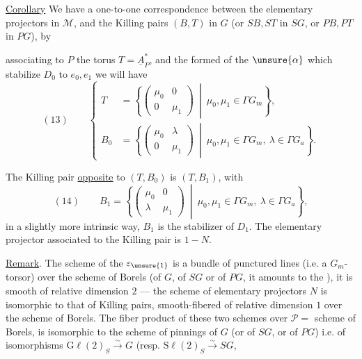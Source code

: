 \uline{Corollary} We have a one-to-one correspondence between the elementary projectors in $\mathcal M$, and the Killing pairs $(B,T)$ in $G$ (or $SB,ST$ in $SG$, or $PB,PT$ in $PG$), by



associating to  $P$ the  torus
$T=\underline{A}_P^*$, and the
formed of the $\unsure{\alpha}$ which stabilize
 $D_0$
to $e_0,e_1$ we will have
\[
(13)\qquad
\left\{
\begin{aligned}
T&=\left\{\begin{pmatrix}\mu_0&0\\0&\mu_1\end{pmatrix}
\ \middle|\ \mu_0,\mu_1\in\Gamma G_m\right\},\\
B_0&=\left\{\begin{pmatrix}\mu_0&\lambda\\0&\mu_1\end{pmatrix}
\ \middle|\ \mu_0,\mu_1\in\Gamma G_m,\ \lambda\in\Gamma G_a\right\}.
\end{aligned}
\right.
\]

The Killing pair \uline{opposite} to $(T,B_0)$ is
$(T,B_1)$, with
\[
(14)\qquad
B_1=\left\{\begin{pmatrix}\mu_0&0\\\lambda&\mu_1\end{pmatrix}
\ \middle|\ \mu_0,\mu_1\in\Gamma G_m,\ \lambda\in\Gamma G_a\right\},
\]
in a slightly more intrinsic way, $B_1$
 is the stabilizer of $D_1$.
The elementary projector associated to the Killing pair
 is $1-N$.

\uline{Remark}. The scheme of the $\varepsilon_{\unsure{1}}$
is a bundle of punctured lines (i.e. a $G_m$-torsor)
over the scheme  of Borels
(of $G$, of $SG$ or of $PG$, it amounts to the ),
it is  smooth of relative dimension $2$ — the scheme of
elementary projectors $N$ is  isomorphic
to that of Killing pairs, smooth-fibered of relative dimension $1$
over the scheme of Borels. The  fiber product of
these two  schemes over
$\mathcal P=$ scheme of Borels, is isomorphic to the scheme
of pinnings of $G$ (or of $SG$, or of $PG$)
i.e. of isomorphisms $\mathrm{G}\ell(2)_S\xrightarrow{\sim}G$
(resp. $\mathrm{S}\ell(2)_S\xrightarrow{\sim}SG$,

